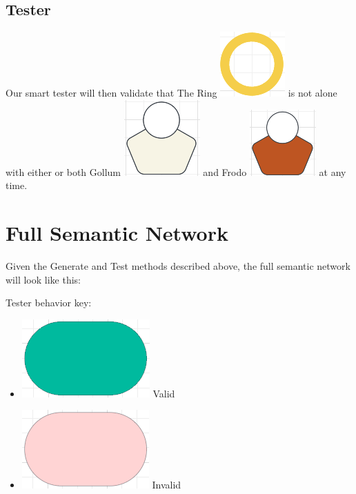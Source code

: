 \documentclass[
	letterpaper, %
]{jdf}
\begin{document}
\begin{Abstract}
\subsection{Tester}
Our smart tester will then validate that The Ring \includegraphics[scale=0.7]{Figures/ring.png} is not alone with either or both Gollum \includegraphics[scale=0.7]{Figures/gollum.png} and Frodo \includegraphics[scale=0.7]{Figures/frodo.png} at any time.

\section{Full Semantic Network}
Given the Generate and Test methods described above, the full semantic network will look like this: 

Tester behavior key:
\begin{itemize}
	\item \includegraphics[scale=0.7]{Figures/valid.png} Valid
	\item \includegraphics[scale=0.7]{Figures/invalid.png} Invalid
\end{itemize}


\end{Abstract}
\end{document}
